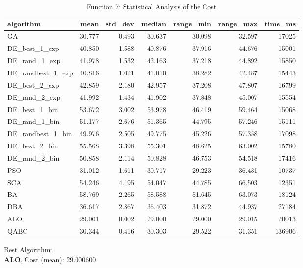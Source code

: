 \documentclass[12pt]{article}
\begin{document}
\begin{table}[H]
    \centering
    \footnotesize
    \begin{adjustbox}{width=1\textwidth}
\begin{tabular}{lrrrrrr}
\toprule
         algorithm &   mean &  std\_dev &  median &  range\_min &  range\_max &  time\_ms \\
\midrule
                GA & 30.777 &    0.493 &  30.637 &     30.098 &     32.597 &    17025 \\
     DE\_best\_1\_exp & 40.850 &    1.588 &  40.876 &     37.916 &     44.676 &    15001 \\
     DE\_rand\_1\_exp & 41.978 &    1.532 &  42.163 &     37.218 &     44.892 &    15850 \\
 DE\_randbest\_1\_exp & 40.816 &    1.021 &  41.010 &     38.282 &     42.487 &    15443 \\
     DE\_best\_2\_exp & 42.859 &    2.180 &  42.957 &     37.208 &     47.807 &    16799 \\
     DE\_rand\_2\_exp & 41.992 &    1.434 &  41.902 &     37.848 &     45.007 &    15554 \\
     DE\_best\_1\_bin & 53.672 &    3.002 &  53.978 &     46.419 &     59.464 &    15068 \\
     DE\_rand\_1\_bin & 51.177 &    2.676 &  51.365 &     44.795 &     57.246 &    15111 \\
 DE\_randbest\_1\_bin & 49.976 &    2.505 &  49.775 &     45.226 &     57.358 &    17098 \\
     DE\_best\_2\_bin & 55.568 &    3.398 &  55.301 &     48.625 &     63.002 &    15780 \\
     DE\_rand\_2\_bin & 50.858 &    2.114 &  50.828 &     46.753 &     54.518 &    17416 \\
               PSO & 31.012 &    1.611 &  30.717 &     29.223 &     36.431 &    10737 \\
               SCA & 54.246 &    4.195 &  54.047 &     44.785 &     66.503 &    12351 \\
                BA & 58.769 &    2.265 &  58.588 &     51.645 &     63.073 &    18124 \\
               DBA & 36.617 &    2.867 &  36.403 &     31.872 &     44.937 &    27184 \\
               ALO & 29.001 &    0.002 &  29.000 &     29.000 &     29.015 &    20013 \\
              QABC & 30.344 &    0.416 &  30.303 &     29.522 &     31.351 &   136906 \\
\bottomrule
\end{tabular}


    \end{adjustbox}
    \caption{Function 7: Statistical Analysis of the Cost} 
    \end{table}
Best Algorithm: \\
\textbf{ALO}, Cost (mean): 29.000600\\
\newpage
\end{document}
